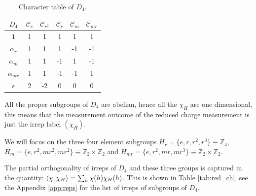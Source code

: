 \documentclass[two column]{article}
\begin{document}
\begin{table}[h]
\centering    \begin{tabular}{c|c c c c c }
         $D_4$ & $\mathcal C_e$ & $\mathcal C_{r^2}$ & $\mathcal C_{r}$ & $\mathcal C_m$ & $\mathcal C_{mr}$ \\
         \hline
         $1$ & 1 & 1 & 1 & 1 & 1 \\
         $\alpha_r $& 1 & 1 & 1 & -1 & -1  \\
         $\alpha_{m}$ & 1 & 1 & -1 & 1 & -1  \\
         $\alpha_{mr}$ & 1 & 1 & -1 & -1 & 1  \\
         $\epsilon$ & 2 & -2 & 0 & 0 & 0  \\
    \end{tabular}
    \caption{Character table of $D_4$.}\label{tab:char}
\end{table}

All the proper subgroups of $D_4$ are abelian, hence all the $\chi_H$ are one dimensional, this means that the measurement outcome of the reduced charge measurement is just the irrep label $(\chi_H)$.

We will focus on the three four element subgroups $H_r = \{e, r, r^2, r^3\} \equiv \mathbb{Z}_4$, $H_m = \{e, r^2, mr^2, mr^2\} \equiv \mathbb{Z}_2 \times \mathbb{Z}_2$ and $H_{mr} = \{e, r^2, mr, mr^3\} \equiv \mathbb{Z}_2 \times \mathbb{Z}_2$.

The partial orthogonality of irreps of $D_4$ and these three groups is captured in the quantity: $ \braket{\chi, \chi_H} = \sum_h \chi(h)\chi_H(h)$. This is shown in Table \ref{tab:red_ch}, see the Appendix \ref{app:reps} for the list of irreps of subgroups of $D_4$.
\end{document}
